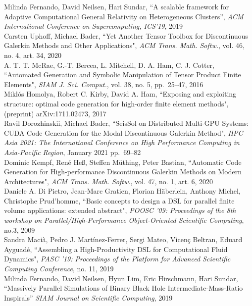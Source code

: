 \documentclass[twoside,leqno,twocolumn]{article}
\begin{document}
\begin{thebibliography}{99}

Milinda Fernando, David Neilsen, Hari Sundar, ``A scalable framework for Adaptive Computational General Relativity on Heterogeneous Clusters”, {\em ACM International Conference on Supercomputing, ICS’19}, 2019
\\
Carsten Uphoff, Michael Bader, ``Yet Another Tensor Toolbox for Discontinuous Galerkin Methods and Other Applications", {\em ACM Trans. Math. Softw.}, vol. 46, no. 4, art. 34, 2020
\\
A. T. T. McRae, G.-T. Bercea, L. Mitchell, D. A. Ham, C. J. Cotter, ``Automated Generation and Symbolic Manipulation of Tensor Product Finite Elements", {\em SIAM J. Sci. Comput.}, vol. 38, no. 5, pp.~25--47, 2016
\\
Miklós Homolya, Robert C. Kirby, David A. Ham, ``Exposing and exploiting structure: optimal code generation for high-order finite element methods", (preprint) arXiv:1711.02473, 2017
\\
Ravil Dorozhinskii, Michael Bader, ``SeisSol on Distributed Multi-GPU Systems: CUDA Code Generation for the Modal Discontinuous Galerkin Method", {\em HPC Asia 2021: The International Conference on High Performance Computing in Asia-Pacific Region}, January 2021 pp.~69--82
\\
Dominic Kempf, René Heß, Steffen Müthing, Peter Bastian, ``Automatic Code Generation for High-performance Discontinuous Galerkin Methods on Modern Architectures", {\em ACM Trans. Math. Softw.}, vol. 47, no. 1, art. 6, 2020
\\
Daniele A. Di Pietro, Jean-Marc Gratien, Florian Häberlein, Anthony Michel, Christophe Prud'homme, ``Basic concepts to design a DSL for parallel finite volume applications: extended abstract", {\em POOSC '09: Proceedings of the 8th workshop on Parallel/High-Performance Object-Oriented Scientific Computing}, no.3, 2009
\\
Sandra Macià, Pedro J. Martínez-Ferrer, Sergi Mateo, Vicenç Beltran, Eduard Ayguadé, ``Assembling a High-Productivity DSL for Computational Fluid Dynamics", {\em PASC '19: Proceedings of the Platform for Advanced Scientific Computing Conference}, no. 11, 2019
\\
Milinda Fernando, David Neilsen, Hyun Lim, Eric Hirschmann, Hari Sundar, ``Massively Parallel Simulations of Binary Black Hole Intermediate-Mass-Ratio Inspirals” {\em SIAM Journal on Scientific Computing}, 2019

\end{thebibliography}
\end{document}
